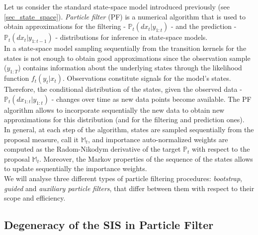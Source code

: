 \documentclass[
]{book}
\theoremstyle{break}
\theoremstyle{nonumberplain}
\begin{document}
Let us consider the standard state-space model introduced previously
(see \ref{sec_state_space}). \textit{Particle filter} (PF) is a
numerical algorithm that is used to obtain approximations for the
filtering - \(\mathbb P_t (dx_t|y_{1:t})\) - and the prediction -
\(\mathbb P_t (dx_t|y_{1:t-1})\) - distributions for inference in
state-space models.~\\
In a state-space model sampling sequentially from the transition kernels
for the states is not enough to obtain good approximations since the
observation sample (\(y_{1:T}\)) contains information about the
underlying states through the likelihood function \(f_t(y_t|x_t)\).
Observations constitute signals for the model's states.\\
Therefore, the conditional distribution of the states, given the
observed data - \(\mathbb P_t(dx_{1:t}|y_{1:t})\) - changes over time as
new data points become available. The PF algorithm allows to incorporate
sequentially the new data to obtain new approximations for this
distribution (and for the filtering and prediction ones).\\
In general, at each step of the algorithm, states are sampled
sequentially from the proposal measure, call it \(\mathbb M_t\), and
importance auto-normalized weights are computed as the Radom-Nikodym
derivative of the target \(\mathbb P_t\) with respect to the proposal
\(\mathbb M_t\). Moreover, the Markov properties of the sequence of the
states allows to update sequentially the importance weights.~\\
We will analyse three different types of particle filtering procedures:
\textit{bootstrap}, \textit{guided} and
\textit{auxiliary particle filters}, that differ between them with
respect to their scope and efficiency.

\subsection{Degeneracy of the SIS in Particle Filter}
\end{document}
